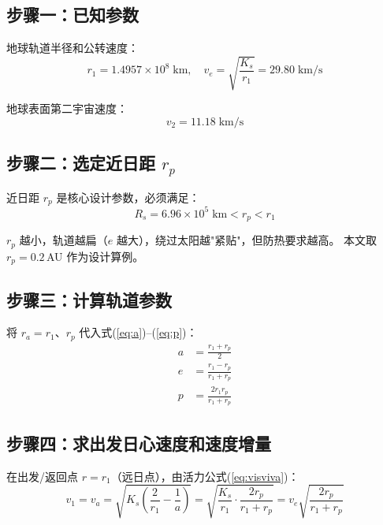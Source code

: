 \documentclass[12pt,a4paper]{ctexart}
\begin{document}
\subsection{步骤一：已知参数}

地球轨道半径和公转速度\cite[\S6.3, pp.~122]{qian2008}：
\begin{equation}\label{eq:ve}
    r_1 = 1.4957 \times 10^8\;\text{km}, \quad
    v_e = \sqrt{\frac{K_s}{r_1}} = 29.80\;\text{km/s}
\end{equation}

地球表面第二宇宙速度\cite[\S1.5, pp.~15]{qian2008}：
\begin{equation}
    v_2 = 11.18\;\text{km/s}
\end{equation}

\subsection{步骤二：选定近日距 $r_p$}

近日距 $r_p$ 是核心设计参数，必须满足：
\begin{equation}
    R_s = 6.96 \times 10^5\;\text{km} < r_p < r_1
\end{equation}

$r_p$ 越小，轨道越扁（$e$ 越大），绕过太阳越"紧贴"，但防热要求越高。
本文取 $r_p = 0.2$\,AU 作为设计算例。

\subsection{步骤三：计算轨道参数}

将 $r_a = r_1$、$r_p$ 代入式(\ref{eq:a})--(\ref{eq:p})：
\begin{align}
    a    &= \frac{r_1 + r_p}{2} \label{eq:step_a} \\
    e    &= \frac{r_1 - r_p}{r_1 + r_p} \label{eq:step_e} \\
    p    &= \frac{2r_1 r_p}{r_1 + r_p} \label{eq:step_p}
\end{align}

\subsection{步骤四：求出发日心速度和速度增量}

在出发/返回点 $r = r_1$（远日点），由活力公式(\ref{eq:visviva})：
\begin{equation}\label{eq:v1}
    v_1 = v_a = \sqrt{K_s\left(\frac{2}{r_1} - \frac{1}{a}\right)}
        = \sqrt{\frac{K_s}{r_1}\cdot\frac{2r_p}{r_1+r_p}}
        = v_e\sqrt{\frac{2r_p}{r_1+r_p}}
\end{equation}
\end{document}
